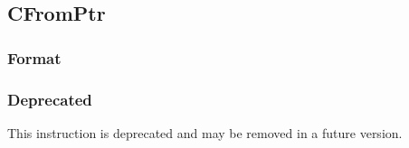 \clearpage
{}
{}
\subsection*{CFromPtr}

\subsubsection*{Format}


\begin{center}
\rvcheriheader
{}
\end{center}


\subsubsection*{Deprecated}

This instruction is deprecated and may be removed in a future version.
